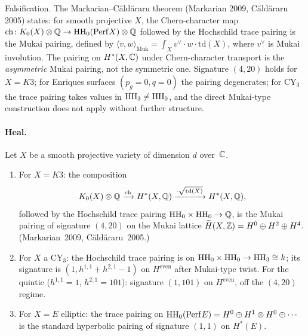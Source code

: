 Falsification. The Markarian--C\u{a}ld\u{a}raru theorem
(Markarian 2009, C\u{a}ld\u{a}raru 2005) states: for smooth
projective $X$, the Chern-character map
$\mathrm{ch} \colon K_0(X) \otimes \mathbb{Q} \to \mathrm{HH}_0(\mathrm{Perf} X) \otimes \mathbb{Q}$
followed by the Hochschild trace pairing is the Mukai pairing,
defined by
$\langle v, w \rangle_{\mathrm{Muk}} = \int_X v^\vee \cdot w \cdot
\mathrm{td}(X)$, where $v^\vee$ is Mukai involution. The pairing
on $H^*(X, \mathbb{C})$ under Chern-character transport is the
\emph{asymmetric} Mukai pairing, not the symmetric one.
Signature $(4, 20)$ holds for $X = K3$; for Enriques surfaces
$(p_g = 0, q = 0)$ the pairing degenerates; for CY$_3$ the
trace pairing takes values in $\mathrm{HH}_3 \neq \mathrm{HH}_0$, and the
direct Mukai-type construction does not apply without further
structure.

\paragraph{Heal.}

\begin{theorem}
\label{thm:gelfand-mukai}
\ClaimStatusDerivation{}
Let $X$ be a smooth projective variety of dimension $d$ over~$\mathbb{C}$.

\begin{enumerate}[label=\textup{(\roman*)}]
\item\label{muk:k3} For $X = K3$: the composition
\[
  K_0(X) \otimes \mathbb{Q}
  \xrightarrow{\mathrm{ch}}
  H^*(X, \mathbb{Q})
  \xrightarrow{\cdot \sqrt{\mathrm{td}(X)}}
  H^*(X, \mathbb{Q}),
\]
followed by the Hochschild trace pairing
$\mathrm{HH}_0 \times \mathrm{HH}_0 \to \mathbb{Q}$, is the Mukai pairing of
signature $(4, 20)$ on the Mukai lattice
$\widetilde{H}(X, \mathbb{Z}) = H^0 \oplus H^2 \oplus H^4$.
(Markarian~2009, C\u{a}ld\u{a}raru~2005.)

\item\label{muk:cy3} For $X$ a CY$_3$: the Hochschild trace
pairing is on $\mathrm{HH}_0 \times \mathrm{HH}_0 \to \mathrm{HH}_3 \cong k$; its
signature is $(1, h^{1,1} + h^{2,1} - 1)$ on $H^{\mathrm{even}}$
after Mukai-type twist. For the quintic ($h^{1,1} = 1$,
$h^{2,1} = 101$): signature $(1, 101)$ on $H^{\mathrm{even}}$,
off the $(4, 20)$ regime.

\item\label{muk:ell} For $X = E$ elliptic: the trace pairing on
$\mathrm{HH}_0(\mathrm{Perf} E) = H^0 \oplus H^1 \otimes H^0 \oplus \cdots$
is the standard hyperbolic pairing of signature $(1, 1)$
on $H^*(E)$.
\end{enumerate}
\end{theorem}

